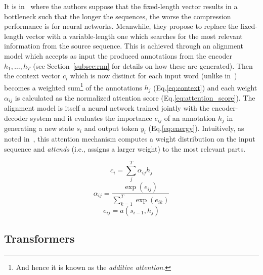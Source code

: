 It is in~\cite{bahdanau2016neural} where the authors suppose that the fixed-length vector results in a bottleneck such that the longer the sequences, the worse the compression performance is for neural networks.
Meanwhile, they propose to replace the fixed-length vector with a variable-length one which searches for the most relevant information from the source sequence.
This is achieved through an alignment model which accepts as input the produced annotations from the encoder $h_1,\ldots, h_T$ (see Section~\ref{subsec:rnn} for details on how these are generated).
Then the context vector $c_{i}$ which is now distinct for each input word (unlike in~\cite{cho-etal-2014-learning,sutskever2014sequence}) becomes a weighted sum\footnote{
    And hence it is known as the \emph{additive attention}.
} of the annotations $h_{j}$ (Eq.\ref{eq:context}) and each weight $\alpha_{ij}$ is calculated as the normalized attention score (Eq.\ref{eq:attention_score}).
The alignment model is itself a neural network trained jointly with the encoder-decoder system and it evaluates the importance $e_{ij}$ of an annotation $h_{j}$ in generating a new state $s_{i}$ and output token $y_{i}$ (Eq.\ref{eq:energy}).
Intuitively, as noted in~\cite{galassi2020attention}, this attention mechanism computes a weight distribution on the input sequence and \emph{attends} (i.e., assigns a larger weight) to the most relevant parts.

\begin{equation}\label{eq:context}
    c_i = \sum_j^T{\alpha_{ij}h_j}
\end{equation}
\begin{equation}\label{eq:attention_score}
    \alpha_{ij} = \frac{\exp(e_{ij})}{\sum_{k=1}^{T} \exp(e_{ik})}
\end{equation}
\begin{equation}\label{eq:energy}
    e_{ij} = a(s_{i-1}, h_j)
\end{equation}


\subsection{Transformers}\label{subsec:transformers}

